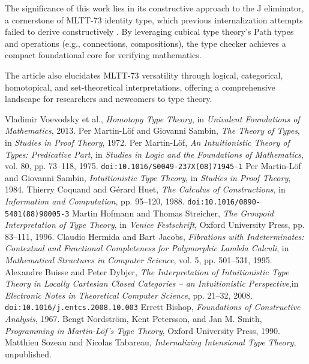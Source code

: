 \documentclass{article}
\begin{document}
The significance of this work lies in its constructive approach to the
J eliminator, a cornerstone of MLTT-73 identity type, which previous
internalization attempts failed to derive constructively \cite{Lof75, Nordstrom90}.
By leveraging cubical type theory’s Path types and operations (e.g., connections,
compositions), the type checker achieves a compact foundational core for verifying mathematics.

The article also elucidates MLTT-73 versatility through logical, categorical,
homotopical, and set-theoretical interpretations, offering a comprehensive
landscape for researchers and newcomers to type theory.

\begin{thebibliography}{99}

 Vladimir Voevodsky et al., \textit{Homotopy Type Theory}, in \textit{Univalent Foundations of Mathematics}, 2013.
 Per Martin-Löf and Giovanni Sambin, \textit{The Theory of Types}, in \textit{Studies in Proof Theory}, 1972.
 Per Martin-Löf, \textit{An Intuitionistic Theory of Types: Predicative Part}, in \textit{Studies in Logic and the Foundations of Mathematics}, vol. 80, pp. 73–118, 1975. \texttt{doi:10.1016/S0049-237X(08)71945-1}
 Per Martin-Löf and Giovanni Sambin, \textit{Intuitionistic Type Theory}, in \textit{Studies in Proof Theory}, 1984.
 Thierry Coquand and Gérard Huet, \textit{The Calculus of Constructions}, in \textit{Information and Computation}, pp. 95–120, 1988. \texttt{doi:10.1016/0890-5401(88)90005-3}
 Martin Hofmann and Thomas Streicher, \textit{The Groupoid Interpretation of Type Theory}, in \textit{Venice Festschrift}, Oxford University Press, pp. 83–111, 1996. 
 Claudio Hermida and Bart Jacobs, \textit{Fibrations with Indeterminates: Contextual and Functional Completeness for Polymorphic Lambda Calculi}, in \textit{Mathematical Structures in Computer Science}, vol. 5, pp. 501–531, 1995.
 Alexandre Buisse and Peter Dybjer, \textit{The Interpretation of Intuitionistic Type Theory in Locally Cartesian Closed Categories -- an Intuitionistic Perspective},in \textit{Electronic Notes in Theoretical Computer Science}, pp. 21–32, 2008. \texttt{doi:10.1016/j.entcs.2008.10.003}
 Errett Bishop, \textit{Foundations of Constructive Analysis}, 1967.
 Bengt Nordström, Kent Petersson, and Jan M. Smith, \textit{Programming in Martin-Löf’s Type Theory}, Oxford University Press, 1990.
 Matthieu Sozeau and Nicolas Tabareau, \textit{Internalizing Intensional Type Theory}, unpublished.

\end{thebibliography}
\end{document}
